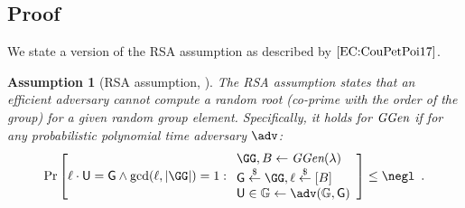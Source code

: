 \documentclass[12pt]{article}
\theoremstyle{Definition}
\newtheorem{assumption}{Assumption}
\begin{document}
\subsection{Proof}
We state a version of the RSA assumption as described by $\cite{EC:CouPetPoi17}$.
\begin{assumption}[RSA assumption,\cite{RivShaAdl78,EC:CouPetPoi17} ]
	The RSA assumption states that an efficient adversary cannot compute a random root (co-prime with the order of the group) for a given random group element. Specifically, it holds for $\textit{GGen}$ if for any probabilistic polynomial time adversary $\adv$:
	\[
    \Pr\left[\ell \cdot \gr{U} = \Generator \wedge \gcd(\ell,|\GG|)=1:
    \begin{array}{l}
         \GG,B \leftarrow \ggen(\lambda)  \\
         \Generator \sample \GG, \ell \sample [B]  \\
         \gr{U} \in \mathbb{G} \leftarrow \adv(\mathbb{G}, \Generator) \\
    \end{array}\right] \leq \negl \enspace .
\]

\end{assumption}
\end{document}
